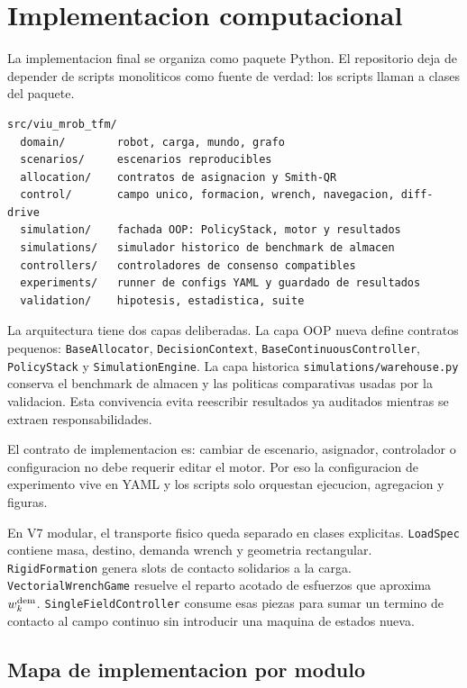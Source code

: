 \section{Implementacion computacional}

La implementacion final se organiza como paquete Python. El repositorio deja de depender
de scripts monoliticos como fuente de verdad: los scripts llaman a clases del paquete.

\begin{verbatim}
src/viu_mrob_tfm/
  domain/        robot, carga, mundo, grafo
  scenarios/     escenarios reproducibles
  allocation/    contratos de asignacion y Smith-QR
  control/       campo unico, formacion, wrench, navegacion, diff-drive
  simulation/    fachada OOP: PolicyStack, motor y resultados
  simulations/   simulador historico de benchmark de almacen
  controllers/   controladores de consenso compatibles
  experiments/   runner de configs YAML y guardado de resultados
  validation/    hipotesis, estadistica, suite
\end{verbatim}

La arquitectura tiene dos capas deliberadas. La capa OOP nueva define contratos
pequenos: \texttt{BaseAllocator}, \texttt{DecisionContext}, \texttt{BaseContinuousController},
\texttt{PolicyStack} y \texttt{SimulationEngine}. La capa historica
\texttt{simulations/warehouse.py} conserva el benchmark de almacen y las politicas
comparativas usadas por la validacion. Esta convivencia evita reescribir resultados ya
auditados mientras se extraen responsabilidades.

El contrato de implementacion es: cambiar de escenario, asignador, controlador o
configuracion no debe requerir editar el motor. Por eso la configuracion de experimento
vive en YAML y los scripts solo orquestan ejecucion, agregacion y figuras.

En V7 modular, el transporte fisico queda separado en clases explicitas.
\texttt{LoadSpec} contiene masa, destino, demanda wrench y geometria rectangular.
\texttt{RigidFormation} genera slots de contacto solidarios a la carga.
\texttt{VectorialWrenchGame} resuelve el reparto acotado de esfuerzos que aproxima
$w_k^{\rm dem}$. \texttt{SingleFieldController} consume esas piezas para sumar un termino
de contacto al campo continuo sin introducir una maquina de estados nueva.

\subsection*{Mapa de implementacion por modulo}

